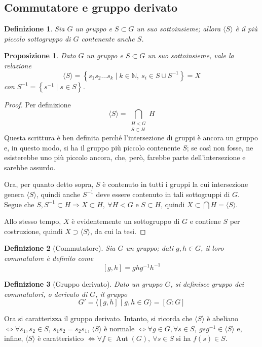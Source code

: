 \documentclass[12pt]{scrartcl}
\theoremstyle{style}
\newtheorem{definizione}{Definizione}[section]
\newtheorem{prop}{Proposizione}[section]
\numberwithin{equation}{subsection}
\begin{document}
\subsection{Commutatore e gruppo derivato}


\begin{definizione}
	Sia $G$ un gruppo e $S \subset G$ un suo sottoinsieme; allora $\langle S \rangle$ \`e il pi\`u piccolo sottogruppo di $G$ contenente anche $S$.
\end{definizione}
\begin{prop}
	Dato $G$ un gruppo e $S \subset G$ un suo sottoinsieme, vale la relazione
	\[
	\langle S \rangle= \left\{ s_1s_2 \ldots s_k  \mid k \in \mathbb{N}, \ s_i \in S \cup S^{-1} \right\} = X
	\] 
	con $S^{-1}= \left\{ s^{-1}  \mid  s \in S \right\} $.
\end{prop}
	\begin{proof}
		Per definizione
		\[
			\langle S \rangle= \bigcap_{\substack{H < G \\ S \subset H}} H
		\] 
		Questa scrittura \`e ben definita perch\'e l'intersezione di gruppi \`e ancora un gruppo e, in questo modo, si ha il gruppo pi\`u piccolo contenente $S$; se cos\`i non fosse, ne esisterebbe uno pi\`u piccolo ancora, che, per\`o, farebbe parte dell'intersezione e sarebbe assurdo.

		Ora, per quanto detto sopra, $S$ \`e contenuto in tutti i gruppi la cui intersezione genera $\langle S \rangle$, quindi anche $S^{-1} $ deve essere contenuto in tali sottogruppi di $G$.
		Segue che $S,S^{-1}\subset H \Rightarrow X \subset H, \ \forall H < G$ e $S \subset H$, quindi $X \subset \bigcap H = \langle S \rangle$.

		Allo stesso tempo, $X$ \`e evidentemente un sottogruppo di $G$ e contiene $S$ per costruzione, quindi $X \supset \langle S \rangle$, da cui la tesi.
	\end{proof}
\begin{definizione}
	[Commutatore]
	Sia $G$ un gruppo; dati $g,h \in G$, il loro \textit{commutatore} \`e definito come
	\[
		[g,h] = ghg^{-1} h^{-1}
	\] 
\end{definizione}
\begin{definizione}
	[Gruppo derivato]
	Dato un gruppo $G$, si definisce \textit{gruppo dei commutatori}, o \textit{derivato} di $G$, il gruppo 
	\[
		G ' = \langle [g,h]  \mid g,h \in G \rangle = [G:G]
	\] 
\end{definizione}
\noindent Ora si caratterizza il gruppo derivato.
Intanto, si ricorda che $\langle S \rangle$ \`e abeliano $\iff \forall s_1,s_2\in S , \  s_1s_2=s_2s_1$, $\langle S \rangle$ \`e normale $\iff \forall g \in G, \forall s \in S, \ gsg^{-1} \in \langle S \rangle$ e, infine, $\langle S \rangle$ \`e caratteristico $\iff \forall f \in \operatorname{Aut} (G) ,\ \forall s \in S$ si ha $f(s) \in S$.
\end{document}
